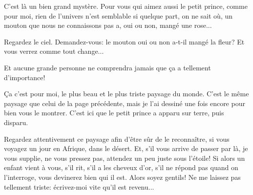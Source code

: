 \documentclass[a4paper]{report}
\begin{document}
C'est là un bien grand mystère. Pour vous qui aimez aussi le petit prince, comme pour moi, rien de l'univers n'est semblable si quelque part, on ne sait où, un mouton que nous ne connaissons pas a, oui ou non, mangé une rose...

Regardez le ciel. Demandez-vous: le mouton oui ou non a-t-il mangé la fleur? Et vous verrez comme tout change...

Et aucune grande personne ne comprendra jamais que ça a tellement d'importance!


Ça c'est pour moi, le plus beau et le plus triste paysage du monde. C'est le même paysage que celui de la page précédente, mais je l'ai dessiné une fois encore pour bien vous le montrer. C'est ici que le petit prince a apparu sur terre, puis disparu.

Regardez attentivement ce paysage afin d'être sûr de le reconnaître, si vous voyagez un jour en Afrique, dans le désert. Et, s'il vous arrive de passer par là, je vous supplie, ne vous pressez pas, attendez un peu juste sous l'étoile! Si alors un enfant vient à vous, s'il rit, s'il a les cheveux d'or, s'il ne répond pas quand on l'interroge, vous devinerez bien qui il est. Alors soyez gentils! Ne me laissez pas tellement triste: écrivez-moi vite qu'il est revenu...
\end{document}
